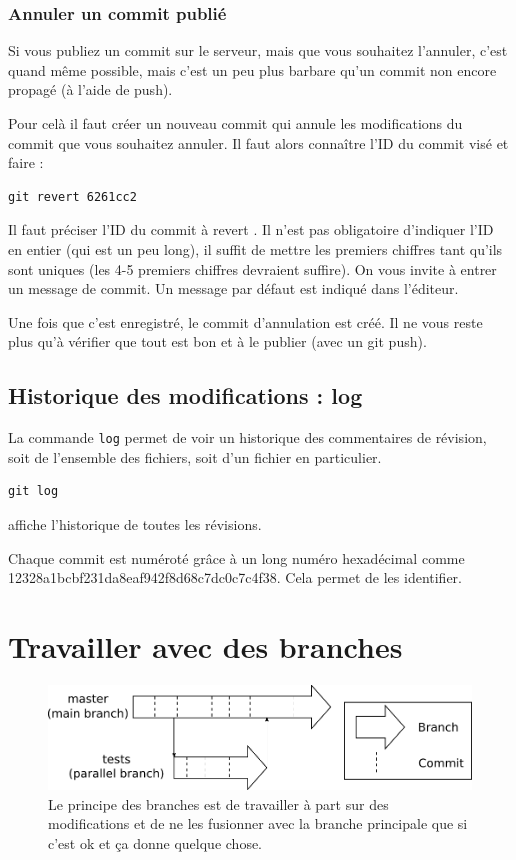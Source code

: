 \documentclass[a4paper,twoside]{article}
\begin{document}
\subsubsection{Annuler un commit publié}
Si vous publiez un commit sur le serveur, mais que vous souhaitez l'annuler, c'est quand même possible, mais c'est un peu plus barbare qu'un commit non encore propagé (à l'aide de push). 

Pour celà il faut créer un nouveau commit qui annule les modifications du commit que vous souhaitez annuler. Il faut alors connaître l'ID du commit visé et faire : 
\begin{verbatim}
git revert 6261cc2
\end{verbatim}
Il faut préciser l'ID du commit à \og revert \fg. Il n'est pas obligatoire d'indiquer l'ID en entier (qui est un peu long), il suffit de mettre les premiers chiffres tant qu'ils sont uniques (les 4-5 premiers chiffres devraient suffire). On vous invite à entrer un message de commit. Un message par défaut est indiqué dans l'éditeur.

Une fois que c'est enregistré, le commit d'annulation est créé. Il ne vous reste plus qu'à vérifier que tout est bon et à le publier (avec un git push).

\subsection{Historique des modifications : log}
La commande \texttt{log} permet de voir un historique des commentaires de révision, soit de l'ensemble des fichiers, soit d'un fichier en particulier.

\begin{verbatim}
git log
\end{verbatim}
affiche l'historique de toutes les révisions.

\begin{attention}
Chaque commit est numéroté grâce à un long numéro hexadécimal comme 12328a1bcbf231da\-8eaf942f8d68c7dc0c7c4f38. Cela permet de les identifier.
\end{attention}

\section{Travailler avec des branches}
\begin{figure}[htb]
\centering
\includegraphics[width=0.75\linewidth]{figure/branchs.pdf}
\caption{Le principe des branches est de travailler à part sur des modifications et de ne les fusionner avec la branche principale que si c'est ok et ça donne quelque chose.}
\end{figure}
\end{document}

